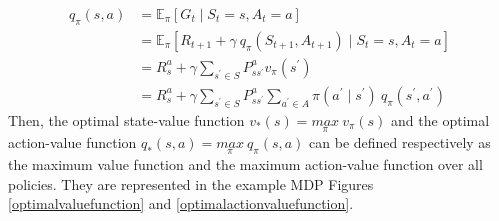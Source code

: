  \begin{equation}
 \label{avf}
 	\begin{split}
 		q_{\pi}(s,a) & = \mathbb{E}_{\pi}[G_t \mid S_t = s, A_t = a] \\
 		& = \mathbb{E}_{\pi}[R_{t+1} + \gamma \: q_{\pi} (S_{t+1},A_{t+1}) \mid S_t = s, A_t = a ] \\
 		& = R_s^{a} + \gamma \sum\limits_{s^{'} \in S}P_{ss^{'}}^{a}v_\pi(s^{'}) \\
 		& = R_s^{a} + \gamma \sum\limits_{s^{'} \in S} P_{ss^{'}}^{a} \sum\limits_{a^{'} \in A}  \pi(a^{'} \mid s^{'})\: q_\pi(s^{'},a^{'})
 	\end{split}
 \end{equation}
Then, the optimal state-value function $v_*(s)= \underset{\pi}{max}\: v_\pi(s)$ and the optimal action-value function $q_*(s,a)=\underset{\pi}{max} \: q_\pi(s,a)$ can be defined respectively as the maximum value function and the maximum action-value function over all policies. They are represented in the example MDP Figures \ref{optimalvaluefunction} and \ref{optimalactionvaluefunction}.

